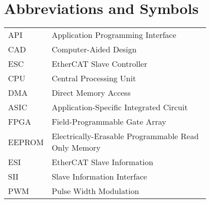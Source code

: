 \chapter*{Abbreviations and Symbols}

\begin{flushleft}
\begin{tabular}{l p{0.8\linewidth}}
API      & Application Programming Interface\\
CAD      & Computer-Aided Design\\
ESC      & EtherCAT Slave Controller\\
CPU      & Central Processing Unit\\
DMA      & Direct Memory Access\\
ASIC     & Application-Specific Integrated Circuit\\
FPGA     & Field-Programmable Gate Array\\
EEPROM   & Electrically-Erasable Programmable Read Only Memory\\
ESI      & EtherCAT Slave Information\\
SII      & Slave Information Interface\\
PWM      & Pulse Width Modulation\\
\end{tabular}
\end{flushleft}

